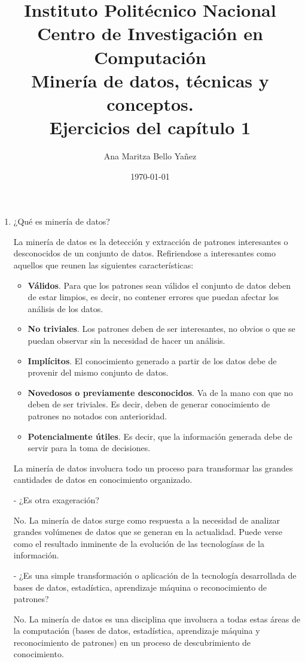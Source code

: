 \documentclass{article}
\title{Instituto Politécnico Nacional \\ Centro de Investigación en Computación
\\
\vspace{1cm}
    Minería de datos, técnicas y conceptos. \\ Ejercicios del capítulo 1 }
\author{
    Ana Maritza Bello Yañez
}
\date{\today}
\begin{document}
\maketitle

\begin{enumerate}
\item ¿Qué es minería de datos?

\textcolor{NavyBlue}{
La minería de datos es la detección y extracción de patrones interesantes o
desconocidos de un conjunto de datos. Refiriendose a interesantes como aquellos
que reunen las siguientes características:}

\begin{itemize}
\item \textcolor{NavyBlue}{ \textbf{Válidos}. Para que los patrones sean válidos el conjunto de datos deben de
estar limpios, es decir, no contener errores que puedan afectar los análisis de
los datos.}
\item \textcolor{NavyBlue}{ \textbf{No triviales}. Los patrones deben de ser interesantes, no obvios o que se
puedan observar sin la necesidad de hacer un análisis.}
\item \textcolor{NavyBlue}{ \textbf{Implícitos}. El conocimiento generado a partir de los datos debe de
provenir del mismo conjunto de datos.}
\item \textcolor{NavyBlue}{ \textbf{Novedosos o previamente desconocidos}. Va de la mano con que no deben de
ser triviales. Es decir, deben de generar conocimiento de patrones no notados
con anterioridad.}
\item \textcolor{NavyBlue}{\textbf{Potencialmente útiles}. Es decir, que la información generada debe de
servir para la toma de decisiones.}
\end{itemize}

\textcolor{NavyBlue}{La minería de datos involucra todo un proceso para transformar las grandes
cantidades de datos en conocimiento organizado.}


- ¿Es otra exageración?

\textcolor{NavyBlue}{No. La minería de datos surge como respuesta a la necesidad
de analizar grandes volúmenes de datos que se generan en la actualidad. Puede
verse como el resultado inminente de la evolución de las tecnologíass de la
información.}

- ¿Es una simple transformación o aplicación de la tecnología desarrollada de
bases de datos, estadística, aprendizaje máquina o reconocimiento de patrones?

\textcolor{NavyBlue}{No. La minería de datos es una disciplina que involucra a
todas estas áreas de la computación (bases de datos, estadística, aprendizaje
máquina y reconocimiento de patrones) en un proceso de descubrimiento de
conocimiento.}


\end{enumerate}
\end{document}
